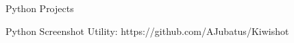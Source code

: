 

\begin{cventries}

%
	\cventry
	{Python Projects}
	{}
	{}
	{}
	{
		\begin{cvitems}
		\item {Python Screenshot Utility: https://github.com/AJubatus/Kiwishot}
		\end{cvitems}
		}


\end{cventries}
